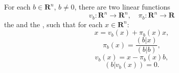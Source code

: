 For each $b \in \mathbf{R}^n$, $b \neq 0$, there are two linear functions
$$v_b: \mathbf{R}^n \to \mathbf{R}^n, \quad \pi_b: \mathbf{R}^n \to \mathbf{R}$$
the  and the , such that for each $x \in \mathbf{R}^n$:
$$x = v_b(x) + \pi_b(x)x,$$
$$\pi_b(x) = \frac{(b|x)}{(b|b)},$$
$$v_b(x) = x - \pi_b(x)b,$$
$$(b|v_b(x)) = 0.$$
